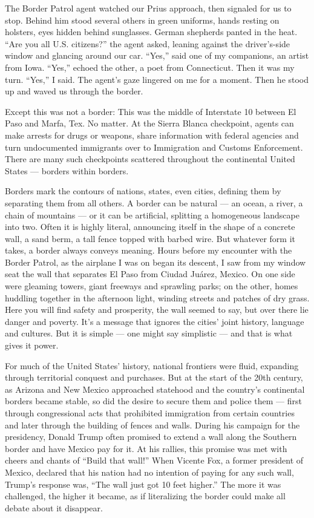The Border Patrol agent watched our Prius approach, then signaled for us
to stop. Behind him stood several others in green uniforms, hands
resting on holsters, eyes hidden behind sunglasses. German shepherds
panted in the heat. ``Are you all U.S. citizens?'' the agent asked,
leaning against the driver's-side window and glancing around our car.
``Yes,'' said one of my companions, an artist from Iowa. ``Yes,'' echoed
the other, a poet from Connecticut. Then it was my turn. ``Yes,'' I
said. The agent's gaze lingered on me for a moment. Then he stood up and
waved us through the border.

Except this was not a border: This was the middle of Interstate 10
between El Paso and Marfa, Tex. No matter. At the Sierra Blanca
checkpoint, agents can make arrests for drugs or weapons, share
information with federal agencies and turn undocumented immigrants over
to Immigration and Customs Enforcement. There are many such checkpoints
scattered throughout the continental United States --- borders within
borders.

Borders mark the contours of nations, states, even cities, defining them
by separating them from all others. A border can be natural --- an
ocean, a river, a chain of mountains --- or it can be artificial,
splitting a homogeneous landscape into two. Often it is highly literal,
announcing itself in the shape of a concrete wall, a sand berm, a tall
fence topped with barbed wire. But whatever form it takes, a border
always conveys meaning. Hours before my encounter with the Border
Patrol, as the airplane I was on began its descent, I saw from my window
seat the wall that separates El Paso from Ciudad Juárez, Mexico. On one
side were gleaming towers, giant freeways and sprawling parks; on the
other, homes huddling together in the afternoon light, winding streets
and patches of dry grass. Here you will find safety and prosperity, the
wall seemed to say, but over there lie danger and poverty. It's a
message that ignores the cities' joint history, language and cultures.
But it is simple --- one might say simplistic --- and that is what gives
it power.

For much of the United States' history, national frontiers were fluid,
expanding through territorial conquest and purchases. But at the start
of the 20th century, as Arizona and New Mexico approached statehood and
the country's continental borders became stable, so did the desire to
secure them and police them --- first through congressional acts that
prohibited immigration from certain countries and later through the
building of fences and walls. During his campaign for the presidency,
Donald Trump often promised to extend a wall along the Southern border
and have Mexico pay for it. At his rallies, this promise was met with
cheers and chants of ``Build that wall!'' When Vicente Fox, a former
president of Mexico, declared that his nation had no intention of paying
for any such wall, Trump's response was, ``The wall just got 10 feet
higher.'' The more it was challenged, the higher it became, as if
literalizing the border could make all debate about it disappear.

